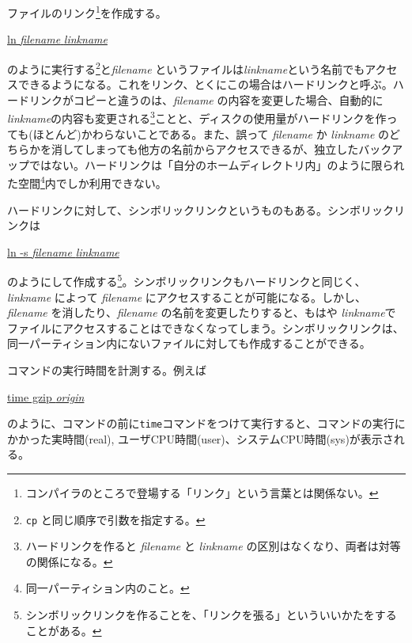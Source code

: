 \begin{itemize}

          ファイルのリンク\footnote{コンパイラのところで登場する「リンク」という言葉とは関係ない。}を作成する。
          \begin{commandline2}
              \prompt \underline{ln \textit{filename} \textit{linkname}}
          \end{commandline2} \noindent
          のように実行する\footnote{{\texttt{cp}} と同じ順序で引数を指定する。}と\textit{filename} というファイルは\textit{linkname}という名前でもアクセスできるようになる。これをリンク、とくにこの場合はハードリンクと呼ぶ。ハードリンクがコピーと違うのは、\textit{filename} の内容を変更した場合、自動的に \textit{linkname}の内容も変更される\footnote{ハードリンクを作ると \textit{filename} と \textit{linkname} の区別はなくなり、両者は対等の関係になる。}ことと、ディスクの使用量がハードリンクを作っても(ほとんど)かわらないことである。また、誤って \textit{filename} か \textit{linkname} のどちらかを消してしまっても他方の名前からアクセスできるが、独立したバックアップではない。ハードリンクは「自分のホームディレクトリ内」のように限られた空間\footnote{同一パーティション内のこと。}内でしか利用できない。

          ハードリンクに対して、シンボリックリンクというものもある。シンボリックリンクは
          \begin{commandline2}
              \prompt \underline{ln -s \textit{filename} \textit{linkname}}
          \end{commandline2} \noindent
          のようにして作成する\footnote{シンボリックリンクを作ることを、「リンクを張る」といういいかたをすることがある。}。シンボリックリンクもハードリンクと同じく、\textit{linkname} によって \textit{filename} にアクセスすることが可能になる。しかし、 \textit{filename} を消したり、\textit{filename} の名前を変更したりすると、もはや \textit{linkname}でファイルにアクセスすることはできなくなってしまう。シンボリックリンクは、同一パーティション内にないファイルに対しても作成することができる。


          コマンドの実行時間を計測する。例えば
          \begin{commandline2}
              \prompt \underline{time gzip \textit{origin}}
          \end{commandline2} \noindent
          のように、コマンドの前に\texttt{time}コマンドをつけて実行すると、コマンドの実行にかかった実時間(real), ユーザCPU時間(user)、システムCPU時間(sys)が表示される。

\end{itemize}

